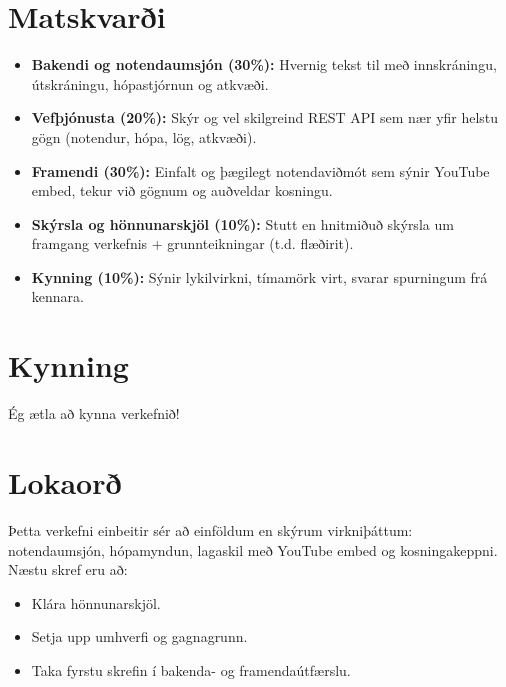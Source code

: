 \documentclass{article}
\begin{document}
\section{Matskvarði}
\begin{itemize}
    \item \textbf{Bakendi og notendaumsjón (30\%):}  
    Hvernig tekst til með innskráningu, útskráningu, hópastjórnun og atkvæði.
    \item \textbf{Vefþjónusta (20\%):}  
    Skýr og vel skilgreind REST API sem nær yfir helstu gögn (notendur, hópa, lög, atkvæði).
    \item \textbf{Framendi (30\%):}  
    Einfalt og þægilegt notendaviðmót sem sýnir YouTube embed, tekur við gögnum og auðveldar kosningu.
    \item \textbf{Skýrsla og hönnunarskjöl (10\%):}  
    Stutt en hnitmiðuð skýrsla um framgang verkefnis + grunnteikningar (t.d. flæðirit).
    \item \textbf{Kynning (10\%):}  
    Sýnir lykilvirkni, tímamörk virt, svarar spurningum frá kennara.
\end{itemize}

\section{Kynning}
Ég ætla að kynna verkefnið!
\section{Lokaorð}
Þetta verkefni einbeitir sér að einföldum en skýrum virkniþáttum: notendaumsjón, hópamyndun, lagaskil með YouTube embed og kosningakeppni. Næstu skref eru að:
\begin{itemize}
    \item Klára hönnunarskjöl.
    \item Setja upp umhverfi og gagnagrunn.
    \item Taka fyrstu skrefin í bakenda- og framendaútfærslu.
\end{itemize}
\end{document}

